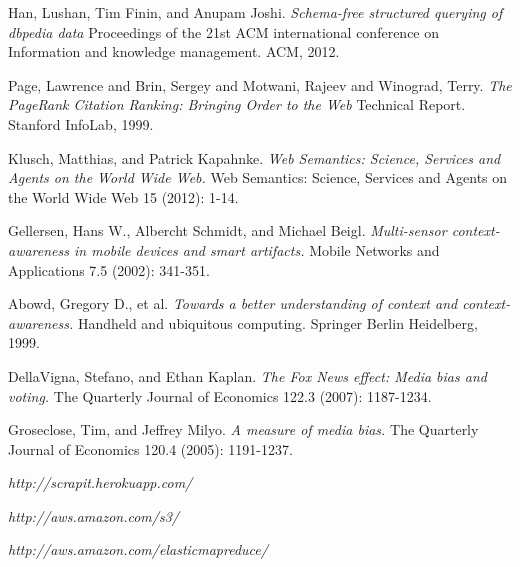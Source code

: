 \documentclass[conference]{IEEEtran}
\begin{document}

%
%
%
\begin{thebibliography}{1}

Han, Lushan, Tim Finin, and Anupam Joshi. \emph{Schema-free structured querying of dbpedia data} Proceedings of the 21st ACM international conference on Information and knowledge management. ACM, 2012.

Page, Lawrence and Brin, Sergey and Motwani, Rajeev and Winograd, Terry. \emph{The PageRank Citation Ranking: Bringing Order to the Web} Technical Report. Stanford InfoLab, 1999.

Klusch, Matthias, and Patrick Kapahnke. \emph{Web Semantics: Science, Services and Agents on the World Wide Web.} Web Semantics: Science, Services and Agents on the World Wide Web 15 (2012): 1-14.

Gellersen, Hans W., Albercht Schmidt, and Michael Beigl. \emph{Multi-sensor context-awareness in mobile devices and smart artifacts.} Mobile Networks and Applications 7.5 (2002): 341-351.

Abowd, Gregory D., et al. \emph{Towards a better understanding of context and context-awareness.} Handheld and ubiquitous computing. Springer Berlin Heidelberg, 1999.

DellaVigna, Stefano, and Ethan Kaplan. \emph{The Fox News effect: Media bias and voting.} The Quarterly Journal of Economics 122.3 (2007): 1187-1234.

Groseclose, Tim, and Jeffrey Milyo. \emph{A measure of media bias.} The Quarterly Journal of Economics 120.4 (2005): 1191-1237.


\emph{http://scrapit.herokuapp.com/} 

\emph{http://aws.amazon.com/s3/}

\emph{http://aws.amazon.com/elasticmapreduce/}


\end{thebibliography}
\end{document}
